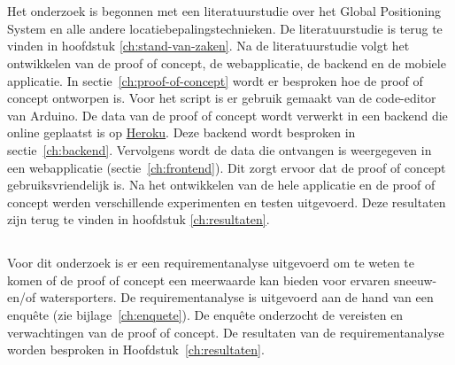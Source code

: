 
\chapter{}
\label{ch:methodologie}

Het onderzoek is begonnen met een literatuurstudie over het Global Positioning System en alle andere locatiebepalingstechnieken. De literatuurstudie is terug te vinden in hoofdstuk \ref{ch:stand-van-zaken}.
\newline
\newline
Na de literatuurstudie volgt het ontwikkelen van de proof of concept, de webapplicatie, de backend en de mobiele applicatie. In sectie~\ref{ch:proof-of-concept} wordt er besproken hoe de proof of concept ontworpen is. Voor het script is er gebruik gemaakt van de code-editor van Arduino. 
\newline
\newline
De data van de proof of concept wordt verwerkt in een backend die online geplaatst is op \href{www.heroku.com}{Heroku}. Deze backend wordt besproken in sectie~\ref{ch:backend}.
\newline
\newline
Vervolgens wordt de data die ontvangen is weergegeven in een webapplicatie (sectie~\ref{ch:frontend}). Dit zorgt ervoor dat de proof of concept gebruiksvriendelijk is. 
\newline
\newline
Na het ontwikkelen van de hele applicatie en de proof of concept werden verschillende experimenten en testen uitgevoerd. Deze resultaten zijn terug te vinden in hoofdstuk \ref{ch:resultaten}.
\section{}
\label{ch:requirementAnalyse}
Voor dit onderzoek is er een requirementanalyse uitgevoerd om te weten te komen of de proof of concept een meerwaarde kan bieden voor ervaren sneeuw- en/of watersporters. De requirementanalyse is uitgevoerd aan de hand van een enquête (zie bijlage~\ref{ch:enquete}).
\newline
De enquête onderzocht de vereisten en verwachtingen van de proof of concept.
De resultaten van de requirementanalyse worden besproken in Hoofdstuk~\ref{ch:resultaten}.



